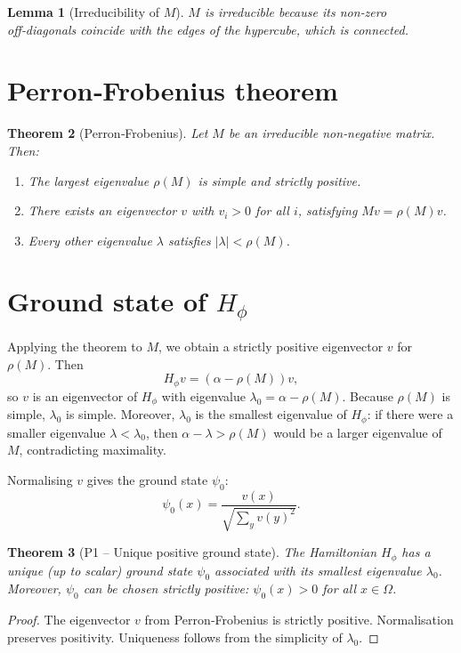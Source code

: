\documentclass[11pt,a4paper]{article}
\newtheorem{theorem}{Theorem}[section]
\newtheorem{lemma}[theorem]{Lemma}
\begin{document}
\begin{lemma}[Irreducibility of $M$]
$M$ is irreducible because its non‑zero off‑diagonals coincide with the edges of the hypercube, which is connected.
\end{lemma}

\section{Perron‑Frobenius theorem}

\begin{theorem}[Perron‑Frobenius]
Let $M$ be an irreducible non‑negative matrix. Then:
\begin{enumerate}
\item The largest eigenvalue $\rho(M)$ is simple and strictly positive.
\item There exists an eigenvector $v$ with $v_i > 0$ for all $i$, satisfying $Mv = \rho(M)v$.
\item Every other eigenvalue $\lambda$ satisfies $|\lambda| < \rho(M)$.
\end{enumerate}
\end{theorem}

\section{Ground state of $H_\phi$}

Applying the theorem to $M$, we obtain a strictly positive eigenvector $v$ for $\rho(M)$. Then
\[
H_\phi v = (\alpha - \rho(M)) v,
\]
so $v$ is an eigenvector of $H_\phi$ with eigenvalue $\lambda_0 = \alpha - \rho(M)$. Because $\rho(M)$ is simple, $\lambda_0$ is simple. Moreover, $\lambda_0$ is the smallest eigenvalue of $H_\phi$: if there were a smaller eigenvalue $\lambda < \lambda_0$, then $\alpha - \lambda > \rho(M)$ would be a larger eigenvalue of $M$, contradicting maximality.

Normalising $v$ gives the ground state $\psi_0$:
\[
\psi_0(x) = \frac{v(x)}{\sqrt{\sum_{y} v(y)^2}}.
\]

\begin{theorem}[P1 – Unique positive ground state]
The Hamiltonian $H_\phi$ has a unique (up to scalar) ground state $\psi_0$ associated with its smallest eigenvalue $\lambda_0$. Moreover, $\psi_0$ can be chosen strictly positive: $\psi_0(x) > 0$ for all $x\in\Omega$.
\end{theorem}
\begin{proof}
The eigenvector $v$ from Perron‑Frobenius is strictly positive. Normalisation preserves positivity. Uniqueness follows from the simplicity of $\lambda_0$.
\end{proof}
\end{document}
